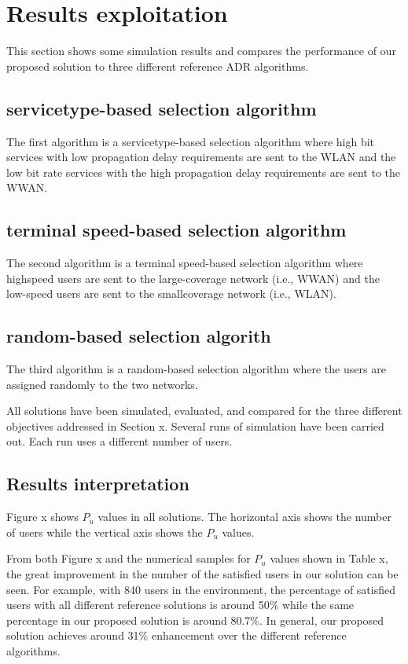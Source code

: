 \section{Results exploitation} \label{sec:Results exploitation}

This section shows some simulation results and compares the performance of our proposed solution to three different reference \ac{ADR} algorithms.

\subsection{servicetype-based selection algorithm}
The first algorithm is a servicetype-based selection algorithm where high bit services with low propagation delay requirements are sent to the WLAN and the low bit rate services with the high propagation delay requirements are sent to the WWAN.

\subsection{terminal speed-based selection algorithm}
The second algorithm is a terminal speed-based selection algorithm where highspeed users are sent to the large-coverage network (i.e.,
	WWAN) and the low-speed users are sent to the smallcoverage network (i.e.,
	WLAN).

\subsection{random-based selection algorith}
The third algorithm is a random-based selection algorithm where the users are assigned randomly to the two networks.

All solutions have been simulated,
	evaluated,
	and compared for the three different objectives addressed in Section x.
Several runs of simulation have been carried out.
Each run uses a different number of users.


\subsection*{Results interpretation}
Figure x shows $P_{u}$ values in all solutions.
The horizontal axis shows the number of users while the vertical axis shows the $P_{u}$ values.

From both Figure x and the numerical samples for $P_{u}$ values shown in Table x,
	the great improvement in the number of the satisfied users in our solution can be seen.
For example,
	with 840 users in the environment,
	the percentage of satisfied users with all different reference solutions is around 50\% while the same percentage in
our proposed solution is around 80.7\%.
In general,
our proposed solution achieves around 31\% enhancement over the different reference algorithms.

